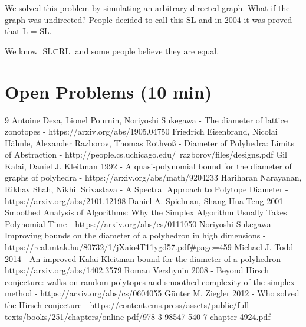 \documentclass{article}
\theoremstyle{definition}
\theoremstyle{example}
\theoremstyle{plain}
\theoremstyle{plain}
\theoremstyle{definition}
\begin{document}
We solved this problem by simulating an arbitrary directed graph. What if the graph was undirected? People decided to call this SL and in 2004 it was proved that L = SL.

We know $\text{SL} \subseteq \text{RL}$ and some people believe they are equal.

\section{Open Problems (10 min)}

\begin{thebibliography}{9}
Antoine Deza, Lionel Pournin, Noriyoshi Sukegawa - The diameter of lattice zonotopes - https://arxiv.org/abs/1905.04750
Friedrich Eisenbrand, Nicolai Hähnle, Alexander Razborov, Thomas Rothvoß - Diameter of Polyhedra: Limits of Abstraction - http://people.cs.uchicago.edu/~razborov/files/designs.pdf
Gil Kalai, Daniel J. Kleitman 1992 - A quasi-polynomial bound for the diameter of graphs of polyhedra - https://arxiv.org/abs/math/9204233
Hariharan Narayanan, Rikhav Shah, Nikhil Srivastava - A Spectral Approach to Polytope Diameter - https://arxiv.org/abs/2101.12198
Daniel A. Spielman, Shang-Hua Teng 2001 - Smoothed Analysis of Algorithms: Why the Simplex Algorithm Usually Takes Polynomial Time - https://arxiv.org/abs/cs/0111050
Noriyoshi Sukegawa - Improving bounds on the diameter of a polyhedron in high dimensions - https://real.mtak.hu/80732/1/jXaio4T11ygd57.pdf\#page=459
Michael J. Todd 2014 - An improved Kalai-Kleitman bound for the diameter of a polyhedron - https://arxiv.org/abs/1402.3579
Roman Vershynin 2008 - Beyond Hirsch conjecture: walks on random polytopes and smoothed complexity of the simplex method - https://arxiv.org/abs/cs/0604055
Günter M. Ziegler 2012 - Who solved the Hirsch conjecture - https://content.ems.press/assets/public/full-texts/books/251/chapters/online-pdf/978-3-98547-540-7-chapter-4924.pdf
\end{thebibliography}
\end{document}
